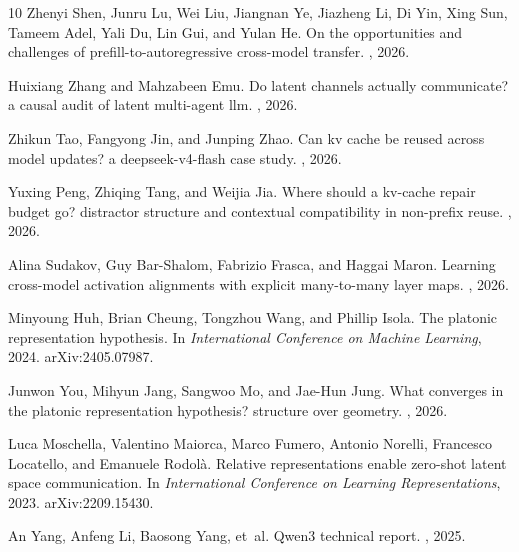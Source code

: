 \documentclass[11pt]{article}
\begin{document}
\begin{thebibliography}{10}
Zhenyi Shen, Junru Lu, Wei Liu, Jiangnan Ye, Jiazheng Li, Di Yin, Xing Sun,
  Tameem Adel, Yali Du, Lin Gui, and Yulan He.
\newblock On the opportunities and challenges of prefill-to-autoregressive
  cross-model transfer.
, 2026.

Huixiang Zhang and Mahzabeen Emu.
\newblock Do latent channels actually communicate? a causal audit of latent
  multi-agent llm.
, 2026.

Zhikun Tao, Fangyong Jin, and Junping Zhao.
\newblock Can kv cache be reused across model updates? a deepseek-v4-flash case
  study.
, 2026.

Yuxing Peng, Zhiqing Tang, and Weijia Jia.
\newblock Where should a kv-cache repair budget go? distractor structure and
  contextual compatibility in non-prefix reuse.
, 2026.

Alina Sudakov, Guy Bar-Shalom, Fabrizio Frasca, and Haggai Maron.
\newblock Learning cross-model activation alignments with explicit many-to-many
  layer maps.
, 2026.

Minyoung Huh, Brian Cheung, Tongzhou Wang, and Phillip Isola.
\newblock The platonic representation hypothesis.
\newblock In {\em International Conference on Machine Learning}, 2024.
\newblock arXiv:2405.07987.

Junwon You, Mihyun Jang, Sangwoo Mo, and Jae-Hun Jung.
\newblock What converges in the platonic representation hypothesis? structure over
  geometry.
, 2026.

Luca Moschella, Valentino Maiorca, Marco Fumero, Antonio Norelli, Francesco
  Locatello, and Emanuele Rodol{\`a}.
\newblock Relative representations enable zero-shot latent space communication.
\newblock In {\em International Conference on Learning Representations}, 2023.
\newblock arXiv:2209.15430.

An Yang, Anfeng Li, Baosong Yang, et~al.
\newblock Qwen3 technical report.
, 2025.

\end{thebibliography}
\end{document}
